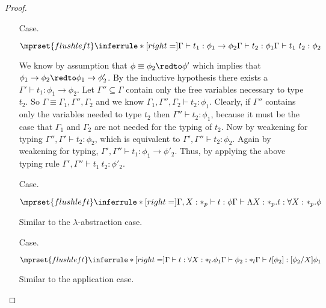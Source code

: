 \begin{proof}
\begin{itemize}
\item[Case.]\ \\
  \begin{center}
    \begin{math}
      $$\mprset{flushleft}
      \inferrule* [right=] {
        \Gamma \vdash t_1 : \phi_1 \rightarrow \phi_2 
        \\
        \Gamma \vdash t_2 : \phi_1
      }{\Gamma \vdash t_1\ t_2 : \phi_2}
    \end{math}
  \end{center}
  We know by assumption that $\phi \equiv \phi_2 \redto \phi'$ which implies that
  $\phi_1 \to \phi_2 \redto \phi_1 \to \phi'_2$.  By the inductive hypothesis
  there exists a $\Gamma' \vdash t_1 : \phi_1 \to \phi_2$.  Let $\Gamma'' \subseteq \Gamma$ contain
  only the free variables necessary to type $t_2$.  So $\Gamma \equiv \Gamma_1,\Gamma'',\Gamma_2$ and
  we know $\Gamma_1,\Gamma'',\Gamma_2 \vdash t_2:\phi_1$.  Clearly, if $\Gamma''$ contains only the
  variables needed to type $t_2$ then $\Gamma'' \vdash t_2:\phi_1$, because it must be the case that
  $\Gamma_1$ and $\Gamma_2$ are not needed for the typing of $t_2$.  Now by weakening for typing
  $\Gamma'',\Gamma' \vdash t_2:\phi_2$, which is equivalent to $\Gamma',\Gamma'' \vdash t_2:\phi_2$.
  Again by weakening for typing, $\Gamma',\Gamma'' \vdash t_1:\phi_1 \to \phi'_2$.  Thus,
  by applying the above typing rule $\Gamma',\Gamma'' \vdash t_1\ t_2:\phi'_2$.  
  
  \item[Case.]\ \\
    \begin{center}
      \begin{math}
        $$\mprset{flushleft}
        \inferrule* [right=] {
          \Gamma, X : *_p \vdash t : \phi
        }{\Gamma \vdash \Lambda X:*_p.t:\forall X : *_p.\phi}
      \end{math} 
    \end{center}
    Similar to the $\lambda$-abstraction case.

  \item[Case.]\ \\
    \begin{center}
      \begin{math}
        $$\mprset{flushleft}
        \inferrule* [right=] {
          \Gamma \vdash t:\forall X:*_l.\phi_1
          \\
          \Gamma \vdash \phi_2:*_l
        }{\Gamma \vdash t[\phi_2]: [\phi_2/X]\phi_1}
      \end{math}
    \end{center}
    Similar to the application case.
\end{itemize}
\end{proof}
